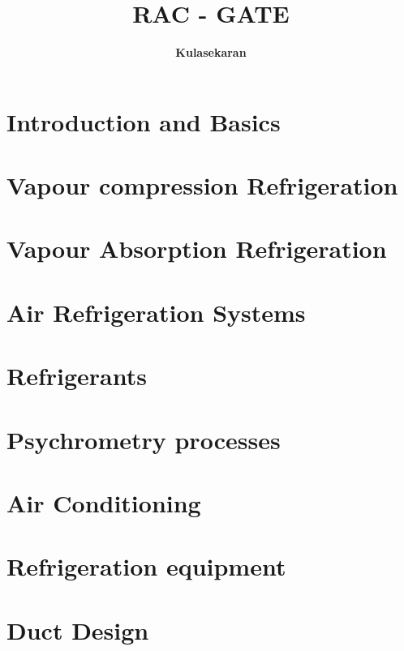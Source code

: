 \documentclass[8pt]{report}
\title{\Huge{\textsc{RAC - GATE}}}
\author{\huge{\textbf{Kulasekaran}}}
\begin{document}
\maketitle
\tableofcontents
\chapter{Introduction and Basics}
\chapter{Vapour compression Refrigeration}
\chapter{Vapour Absorption Refrigeration}
\chapter{Air Refrigeration Systems}
\chapter{Refrigerants}
\chapter{Psychrometry processes}
\chapter{Air Conditioning}
\chapter{Refrigeration equipment}
\chapter{Duct Design}
\end{document}
